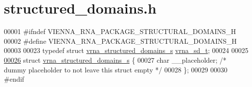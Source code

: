 \hypertarget{structured__domains_8h_source}{}\section{structured\+\_\+domains.\+h}
\label{structured__domains_8h_source}

\begin{DoxyCode}
00001 \textcolor{preprocessor}{#ifndef VIENNA\_RNA\_PACKAGE\_STRUCTURAL\_DOMAINS\_H}
00002 \textcolor{preprocessor}{#define VIENNA\_RNA\_PACKAGE\_STRUCTURAL\_DOMAINS\_H}
00003 
00023 \textcolor{keyword}{typedef} \textcolor{keyword}{struct }\hyperlink{structvrna__structured__domains__s}{vrna\_structured\_domains\_s} \hyperlink{structvrna__structured__domains__s}{vrna\_sd\_t};
00024 
00025 
\hyperlink{structvrna__structured__domains__s}{00026} \textcolor{keyword}{struct }\hyperlink{structvrna__structured__domains__s}{vrna\_structured\_domains\_s} \{
00027   \textcolor{keywordtype}{char} \_\_placeholder; \textcolor{comment}{/* dummy placeholder to not leave this struct empty */}
00028 \};
00029 
00030 \textcolor{preprocessor}{#endif}
\end{DoxyCode}
